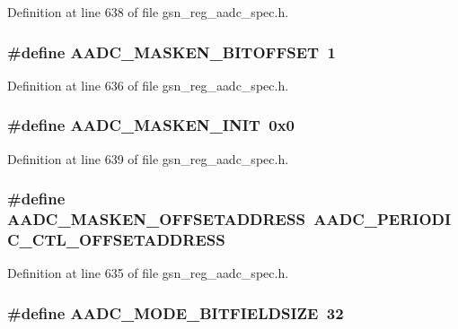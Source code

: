 Definition at line 638 of file gsn\_\-reg\_\-aadc\_\-spec.h.

\hypertarget{a00543_a8747161908c80bc0a984007465d373dd}{
\subsubsection[{AADC\_\-MASKEN\_\-BITOFFSET}]{\setlength{\rightskip}{0pt plus 5cm}\#define AADC\_\-MASKEN\_\-BITOFFSET~1}}
\label{a00543_a8747161908c80bc0a984007465d373dd}


Definition at line 636 of file gsn\_\-reg\_\-aadc\_\-spec.h.

\hypertarget{a00543_aa0647529993819bee9aaf0dc03d88bbe}{
\subsubsection[{AADC\_\-MASKEN\_\-INIT}]{\setlength{\rightskip}{0pt plus 5cm}\#define AADC\_\-MASKEN\_\-INIT~0x0}}
\label{a00543_aa0647529993819bee9aaf0dc03d88bbe}


Definition at line 639 of file gsn\_\-reg\_\-aadc\_\-spec.h.

\hypertarget{a00543_ae6c302be4c388501965422a055cd6e38}{
\subsubsection[{AADC\_\-MASKEN\_\-OFFSETADDRESS}]{\setlength{\rightskip}{0pt plus 5cm}\#define AADC\_\-MASKEN\_\-OFFSETADDRESS~AADC\_\-PERIODIC\_\-CTL\_\-OFFSETADDRESS}}
\label{a00543_ae6c302be4c388501965422a055cd6e38}


Definition at line 635 of file gsn\_\-reg\_\-aadc\_\-spec.h.

\hypertarget{a00543_a165cb54d95a5a3fd1d23308e77449776}{
\subsubsection[{AADC\_\-MODE\_\-BITFIELDSIZE}]{\setlength{\rightskip}{0pt plus 5cm}\#define AADC\_\-MODE\_\-BITFIELDSIZE~32}}
\label{a00543_a165cb54d95a5a3fd1d23308e77449776}


